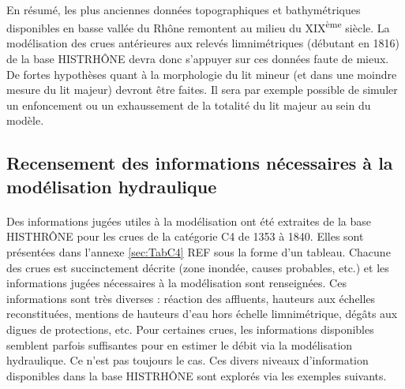 \documentclass[11pt]{article}
\begin{document}
	\paragraph{} En résumé, les plus anciennes données topographiques et bathymétriques disponibles en basse vallée du Rhône remontent au milieu du XIX\textsuperscript{ème} siècle. La modélisation des crues antérieures aux relevés limnimétriques (débutant en 1816) de la base HISTRHÔNE devra donc s'appuyer sur ces données faute de mieux. De fortes hypothèses quant à la morphologie du lit mineur (et dans une moindre mesure du lit majeur) devront être faites. Il sera par exemple possible de simuler un enfoncement ou un exhaussement de la totalité du lit majeur au sein du modèle. 
	
\FloatBarrier	
	
	\subsection{Recensement des informations nécessaires à la modélisation hydraulique} 
	
	\paragraph{} Des informations jugées utiles à la modélisation ont été extraites de la base HISTHRÔNE pour les crues de la catégorie C4 de 1353 à 1840. Elles sont présentées dans l'annexe \ref{sec:TabC4} REF sous la forme d'un tableau. Chacune des crues est succinctement décrite (zone inondée, causes probables, etc.) et les informations jugées nécessaires à la modélisation sont renseignées. Ces informations sont très diverses : réaction des affluents, hauteurs aux échelles reconstituées, mentions de hauteurs d'eau hors échelle limnimétrique, dégâts aux digues de protections, etc. Pour certaines crues, les informations disponibles semblent parfois suffisantes pour en estimer le débit via la modélisation hydraulique. Ce n'est pas toujours le cas. Ces divers niveaux d'information disponibles dans la base HISTRHÔNE sont explorés via les exemples suivants. 
	
\end{document}
